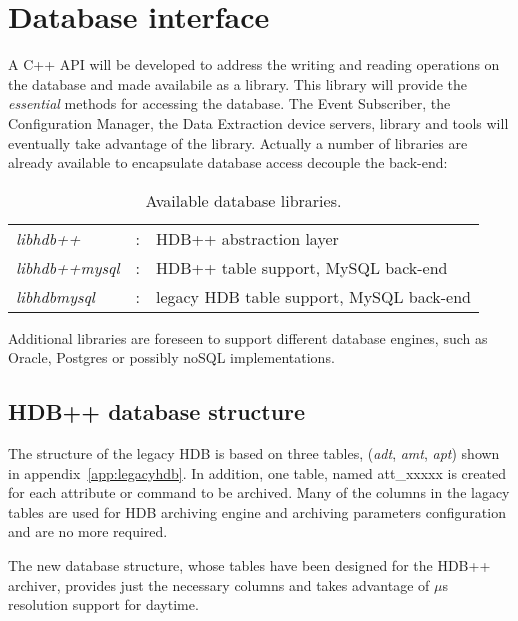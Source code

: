 \documentclass[11pt,a4paper]{article}
\def \hdb{HDB++}
\def \es{Event Subscriber}
\def \cm{Configuration Manager}
\def \de{Data Extraction}
\begin{document}
\section{Database interface}
\label{db}
A C++ API will be developed to address the writing and reading
operations on the database and made availabile as a library.
This library will provide the \emph{essential} methods for
accessing the database. The \es{}, the \cm{}, the \de{} device servers,
library and tools will eventually take advantage of the library.
Actually a number of libraries are already available to encapsulate
database access decouple the \mbox{back-end}:
\begin{table}[H]
	\centering
	\begin{tabular}{lll}
	\emph{libhdb++} & : & \hdb{} abstraction layer \\
	\emph{libhdb++mysql} & : & \hdb{} table support, MySQL \mbox{back-end} \\
		\emph{libhdbmysql} & : & legacy HDB table support, MySQL \mbox{back-end} \\
	\end{tabular}
	\caption{Available database libraries.}
	\label{db:libs}
\end{table}
Additional libraries are foreseen to support different database
engines, such as Oracle, Postgres or possibly noSQL implementations.

\subsection{\hdb{} database structure}
The structure of the legacy HDB is based on three tables,
(\emph{adt}, \emph{amt}, \emph{apt}) shown in appendix~\ref{app:legacyhdb}.
In addition, one table, named att\_xxxxx is
created for each attribute or command to be archived.
Many of the columns in the lagacy tables are used for
HDB archiving engine and archiving parameters configuration and are
no more required. 

The new database structure, whose tables have been designed for the
\hdb{} archiver, provides just the necessary columns and 
takes advantage of $\mu$s resolution support for daytime.
\end{document}
